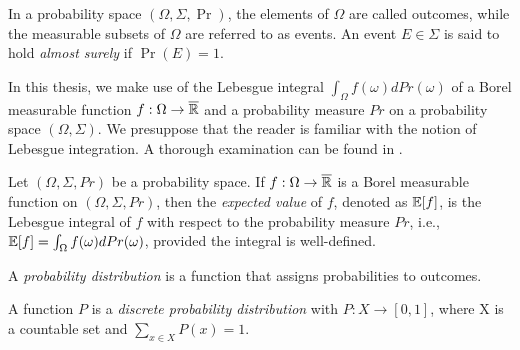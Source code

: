 In a probability space $(\Omega, \Sigma, \Pr)$, the elements of $\Omega$ are called outcomes, while the measurable subsets of $\Omega$ are referred to as events. An event $E \in \Sigma$ is said to hold \textit{almost surely} if $\Pr(E) = 1$.

In this thesis, we make use of the Lebesgue integral $\int_{\Omega}f(\omega)dPr(\omega)$ of a Borel measurable function $f:\Omega \rightarrow \overline{\mathbb{R}}$ and a probability measure $Pr$ on a probability space $(\Omega,\Sigma)$. We presuppose that the reader is familiar with the notion of Lebesgue integration. A thorough examination can be found in \cite[Chapter 1.5]{Ash_Book_Matheteil}.

\begin{definition}
    Let $(\Omega,\Sigma,Pr)$ be a probability space. If $f:\Omega \rightarrow \overline{\mathbb{R}}$ is a Borel measurable function on $(\Omega,\Sigma,Pr)$, then the \textit{expected value} of $f$, denoted as $\mathbb{E}[f]$, is the Lebesgue integral of $f$ with respect to the probability measure $Pr$, i.e., $\mathbb{E}[f] = \int_{\Omega}f(\omega)dPr(\omega)$, provided the integral is well-defined.
\end{definition}


A \textit{probability distribution} is a function that assigns probabilities to outcomes.
\begin{definition}\label{def:discrete_probability_distribution}
    A function $P$ is a \textit{discrete probability distribution} with $P: X \rightarrow [0,1]$, where X is a countable set and $\sum_{x\in X}P(x) = 1$.
\end{definition}





